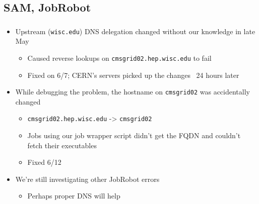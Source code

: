 \documentclass{beamer}
\begin{document}
\subsection{SAM, JobRobot}
\begin{frame}
\frametitle{}
\begin{itemize}
    \item Upstream ({\tt wisc.edu}) DNS delegation changed without our knowledge in late May
    \begin{itemize}
        \item Caused reverse lookups on {\tt cmsgrid02.hep.wisc.edu} to fail
        \item Fixed on 6/7; CERN's servers picked up the changes ~24 hours later
    \end{itemize}
    \item While debugging the problem, the hostname on {\tt cmsgrid02} was accidentally changed
    \begin{itemize}
        \item {\tt cmsgrid02.hep.wisc.edu} -> {\tt cmsgrid02}
        \item Jobs using our job wrapper script didn't get the FQDN and couldn't fetch their executables
        \item Fixed 6/12
    \end{itemize}
    \item We're still investigating other JobRobot errors
    \begin{itemize}
        \item Perhaps proper DNS will help
    \end{itemize}

\end{itemize}
\end{frame}
\end{document}
